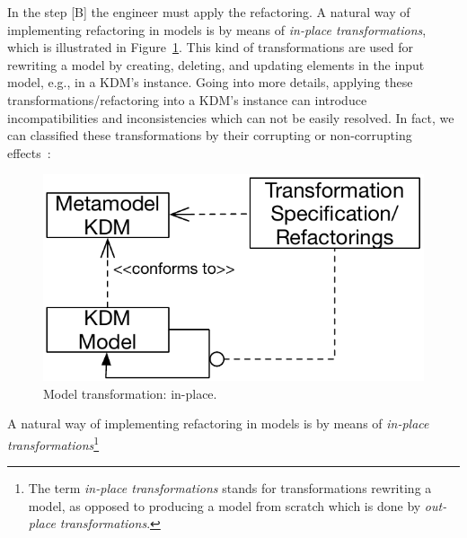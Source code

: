 In the step [B] the engineer must apply the refactoring. A natural way of implementing refactoring in models is by means of \textit{in-place transformations}, which is illustrated in Figure~\ref{fig:endogenous_inplace}. This kind of transformations are used for rewriting a model by creating, deleting, and updating elements in the input model, e.g., in a KDM's instance. Going into more details, applying these transformations/refactoring into a KDM's instance can introduce incompatibilities and inconsistencies which can not be easily resolved. In fact, we can classified these transformations by their corrupting or non-corrupting effects~\cite{towardssynchronizing07}:

\begin{figure}[h]
	\centering
	\includegraphics[scale=0.6]{figuras/endogenous_in_place_alg}
	\caption{Model transformation: in-place.}
	\label{fig:endogenous_inplace}
\end{figure}

%
%
%









A natural way of implementing refactoring in models is by means of \textit{in-place transformations}\footnote{The term \textit{in-place transformations} stands for transformations rewriting a model, as opposed to producing a model from scratch which is done by \textit{out-place transformations}.} 

